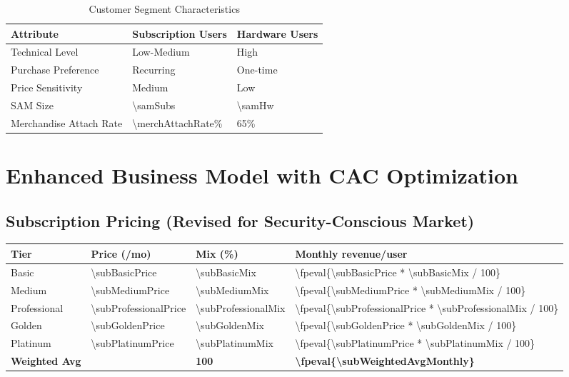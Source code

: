 \documentclass[11pt]{article}
\newcommand{\numfpeval}[1]{\num{\fpeval{#1}}}
\begin{document}
\begin{table}[H]
\centering
\caption{Customer Segment Characteristics}
\begin{tabularx}{\linewidth}{l X X}
\toprule
Attribute & Subscription Users & Hardware Users \\\midrule
Technical Level & Low-Medium & High \\
Purchase Preference & Recurring & One-time \\
Price Sensitivity & Medium & Low \\
SAM Size & \num{\samSubs}\cite{chainalysis2024,triple2023} & \num{\samHw}\cite{chainalysis2024,triple2023} \\
Merchandise Attach Rate & \num{\merchAttachRate}\%\cite{shopify2024} & \num{65}\%\cite{shopify2024} \\
\bottomrule
\end{tabularx}
\end{table}

\section{Enhanced Business Model with CAC Optimization}

\subsection{Subscription Pricing (Revised for Security-Conscious Market)}
\begin{table}[H]
\centering
\begin{tabularx}{\linewidth}{l Y Y Y}
\toprule
Tier & Price (/mo) & Mix (\%) & Monthly revenue/user \\\midrule
Basic   & \num{\subBasicPrice}  & \num{\subBasicMix} & \numfpeval{\subBasicPrice * \subBasicMix / 100} \\
Medium  & \num{\subMediumPrice} & \num{\subMediumMix} & \numfpeval{\subMediumPrice * \subMediumMix / 100} \\
Professional & \num{\subProfessionalPrice} & \num{\subProfessionalMix} & \numfpeval{\subProfessionalPrice * \subProfessionalMix / 100} \\
Golden  & \num{\subGoldenPrice} & \num{\subGoldenMix} & \numfpeval{\subGoldenPrice * \subGoldenMix / 100} \\
Platinum & \num{\subPlatinumPrice} & \num{\subPlatinumMix} & \numfpeval{\subPlatinumPrice * \subPlatinumMix / 100} \\\midrule
\textbf{Weighted Avg} &  & \textbf{\num{100}} & \textbf{\numfpeval{\subWeightedAvgMonthly}} \\
\bottomrule
\end{tabularx}
\end{table}
\end{document}
